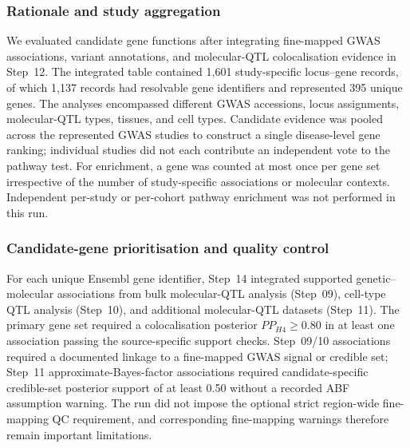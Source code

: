 \documentclass[11pt,a4paper]{article}
\begin{document}
\subsubsection{Rationale and study aggregation}
We evaluated candidate gene functions after integrating fine-mapped GWAS associations, variant annotations, and molecular-QTL colocalisation evidence in Step~12. The integrated table contained 1,601 study-specific locus--gene records, of which 1,137 records had resolvable gene identifiers and represented 395 unique genes. The analyses encompassed different GWAS accessions, locus assignments, molecular-QTL types, tissues, and cell types. Candidate evidence was pooled across the represented GWAS studies to construct a single disease-level gene ranking; individual studies did not each contribute an independent vote to the pathway test. For enrichment, a gene was counted at most once per gene set irrespective of the number of study-specific associations or molecular contexts. Independent per-study or per-cohort pathway enrichment was not performed in this run.

\subsubsection{Candidate-gene prioritisation and quality control}
For each unique Ensembl gene identifier, Step~14 integrated supported genetic--molecular associations from bulk molecular-QTL analysis (Step~09), cell-type QTL analysis (Step~10), and additional molecular-QTL datasets (Step~11). The primary gene set required a colocalisation posterior $PP_{H4}\geq0.80$ in at least one association passing the source-specific support checks. Step~09/10 associations required a documented linkage to a fine-mapped GWAS signal or credible set; Step~11 approximate-Bayes-factor associations required candidate-specific credible-set posterior support of at least 0.50 without a recorded ABF assumption warning. The run did not impose the optional strict region-wide fine-mapping QC requirement, and corresponding fine-mapping warnings therefore remain important limitations.
\end{document}
